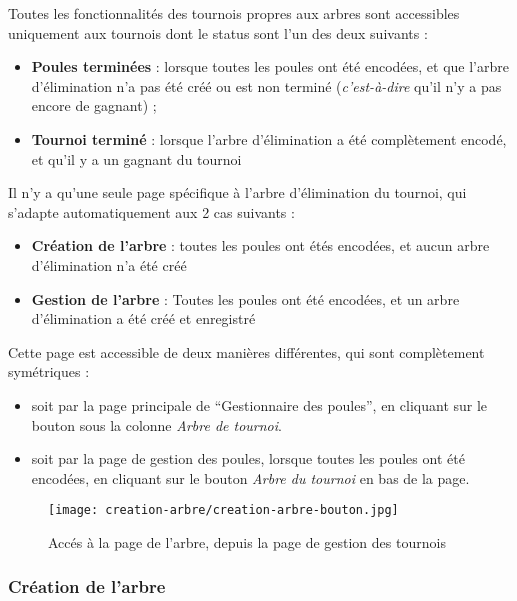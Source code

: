 Toutes les fonctionnalités des tournois propres aux arbres sont accessibles uniquement aux tournois dont le status sont l'un des deux suivants :

\begin{itemize}
\item \textbf{Poules terminées} : lorsque toutes les poules ont été encodées, et que l'arbre d'élimination n'a pas été créé ou est non terminé (\textit{c'est-à-dire} qu'il n'y a pas encore de gagnant) ;
\item \textbf{Tournoi terminé} : lorsque l'arbre d'élimination a été complètement encodé, et qu'il y a un gagnant du tournoi
\end{itemize}
\bigskip

Il n'y a qu'une seule page spécifique à l'arbre d'élimination du tournoi, qui s'adapte automatiquement aux 2 cas suivants :

\begin{itemize}
\item \textbf{Création de l'arbre} : toutes les poules ont étés encodées, et aucun arbre d'élimination n'a été créé
\item \textbf{Gestion de l'arbre} : Toutes les poules ont été encodées, et un arbre d'élimination a été créé et enregistré
\end{itemize}
\bigskip

Cette page est accessible de deux manières différentes, qui sont complètement symétriques :

\begin{itemize}
\item soit par la page principale de \enquote{Gestionnaire des poules}, en cliquant sur le bouton sous la colonne \textit{Arbre de tournoi}.
\item soit par la page de gestion des poules, lorsque toutes les poules ont été encodées, en cliquant sur le bouton \textit{Arbre du tournoi} en bas de la page.
\end{itemize}
\bigskip

\begin{figure}[H]
\centering
\texttt{[image: creation-arbre/creation-arbre-bouton.jpg]}
\caption{Accés à la page de l'arbre, depuis la page de gestion des tournois}
\end{figure}

\subsubsection{Création de l'arbre}

